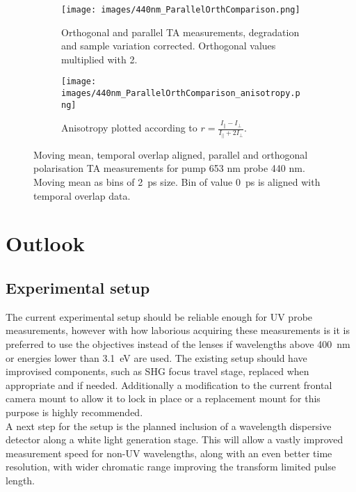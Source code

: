 \documentclass[twoside,openright,listof=numbered]{scrreprt}
\begin{document}
\begin{figure}[hbt]
\centering
\begin{subfigure}[t]{0.49\linewidth}
\texttt{[image: images/440nm\_ParallelOrthComparison.png]}
\caption{Orthogonal and parallel TA measurements, degradation and sample variation corrected. Orthogonal values multiplied with 2.\label{fig:polarisationComp}}
\end{subfigure}
\hfill
\begin{subfigure}[t]{0.49\linewidth}
\texttt{[image: images/440nm\_ParallelOrthComparison\_anisotropy.png]}
\caption{Anisotropy plotted according to $r = \frac{I_\parallel-I_\perp}{I_\parallel + 2 I_\perp}$.}
\end{subfigure}
\caption[Moving mean transient absorption scan comparison and anisotropy development for orthogonal and parallel pump \qty{653}{\nano\meter} and probe \qty{440}{\nano\meter}.]{Moving mean, temporal overlap aligned, parallel and orthogonal polarisation TA measurements for pump 653 nm probe 440 nm. Moving mean as bins of \SI{2}{\pico\second} size. Bin of value \qty{0}{\pico\second} is aligned with temporal overlap data.\label{fig:440nmPolarisations}}
\end{figure}

\chapter{Outlook}
\section{Experimental setup}
The current experimental setup should be reliable enough for UV probe measurements, however with how laborious acquiring these measurements is it is preferred to use the objectives instead of the lenses if wavelengths above \qty{400}{\nano\meter} or energies lower than \qty{3.1}{\electronvolt} are used. The existing setup should have improvised components, such as SHG focus travel stage, replaced when appropriate and if needed. Additionally a modification to the current frontal camera mount to allow it to lock in place or a replacement mount for this purpose is highly recommended.\\
A next step for the setup is the planned inclusion of a wavelength dispersive detector along a white light generation stage. This will allow a vastly improved measurement speed for non-UV wavelengths, along with an even better time resolution, with wider chromatic range improving the transform limited pulse length.
\end{document}
